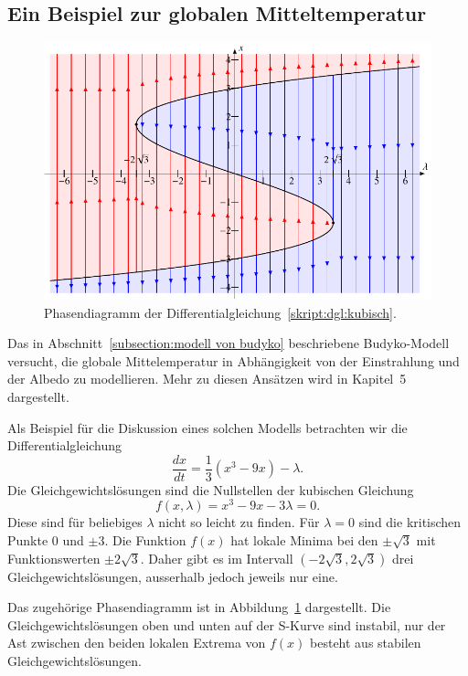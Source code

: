 \subsection{Ein Beispiel zur globalen Mitteltemperatur\label{subsection:budyko}}
%
\begin{figure}
\includegraphics{chapters/3/kubisch.pdf}
\caption{Phasendiagramm der Differentialgleichung~\eqref{skript:dgl:kubisch}.
\label{skript:dgl:kubischfig}}
\end{figure}
Das in Abschnitt~\ref{subsection:modell von budyko} beschriebene
Budyko-Modell versucht, die globale Mittelemperatur in Abhängigkeit
von der Einstrahlung und der Albedo zu modellieren.
Mehr zu diesen Ansätzen wird in Kapitel~5 dargestellt.

Als Beispiel für die Diskussion eines solchen Modells betrachten wir
die Differentialgleichung
\begin{equation}
\frac{dx}{dt}
=
\frac13(x^3 - 9x) - \lambda.
\label{skript:dgl:kubisch}
\end{equation}
Die Gleichgewichtslösungen sind die Nullstellen der kubischen Gleichung
\[
f(x,\lambda)
=
x^3-9x-3\lambda=0.
\]
Diese sind für beliebiges $\lambda$ nicht so leicht zu finden.
Für $\lambda=0$ sind die kritischen Punkte $0$ und $\pm 3$.
Die Funktion $f(x)$ hat lokale Minima bei den $\pm\!\sqrt{3}$ mit
Funktionswerten $\pm2\!\sqrt{3}$.
Daher gibt es im Intervall $(-2\!\sqrt{3},2\!\sqrt{3})$ drei 
Gleichgewichtslösungen, ausserhalb jedoch jeweils nur eine.

Das zugehörige Phasendiagramm ist in Abbildung~\ref{skript:dgl:kubischfig}
dargestellt.
Die Gleichgewichtslösungen oben und unten auf der S-Kurve sind instabil,
nur der Ast zwischen den beiden lokalen Extrema von $f(x)$ besteht
aus stabilen Gleichgewichtslösungen.

